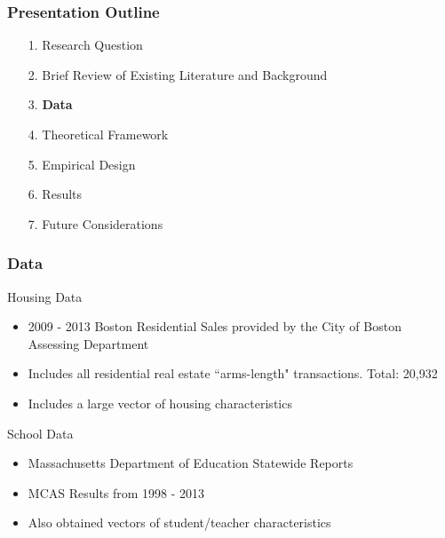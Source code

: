 \documentclass{beamer}
\begin{document}
\begin{frame}
\label{Presentation Outline 3}
\frametitle{Presentation Outline}
\begin{enumerate}
\item[1.] Research Question
\newline
\item[2.] Brief Review of Existing Literature and Background
\newline
\item[3.] \textbf{Data}
\newline
\item[4.] Theoretical Framework
\newline
\item[5.] Empirical Design
\newline
\item[6.] Results
\newline
\item[7.] Future Considerations
\end{enumerate}
\end{frame}

\begin{frame}
\label{Data}
\frametitle{Data}
Housing Data
\begin{itemize}
\item 2009 - 2013 Boston Residential Sales provided by the City of Boston Assessing Department
\item Includes all residential real estate ``arms-length" transactions. Total: 20,932
\item Includes a large vector of housing characteristics \newline
\end{itemize}

School Data
\begin{itemize}
\item Massachusetts Department of Education Statewide Reports
\item MCAS Results from 1998 - 2013
\item Also obtained vectors of student/teacher characteristics
\end{itemize}
\end{frame}
\end{document}
